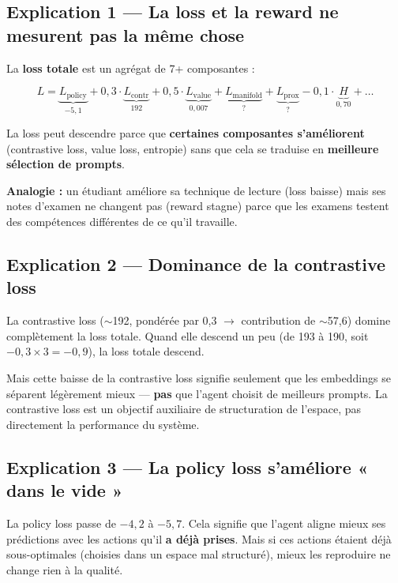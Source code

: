 \documentclass[11pt,a4paper]{article}
\begin{document}
\subsection{Explication 1 — La loss et la reward ne mesurent pas la même chose}

La \textbf{loss totale} est un agrégat de 7+ composantes :

\begin{equation}
L = \underbrace{L_{\text{policy}}}_{-5{,}1} + 0{,}3 \cdot \underbrace{L_{\text{contr}}}_{192} + 0{,}5 \cdot \underbrace{L_{\text{value}}}_{0{,}007} + \underbrace{L_{\text{manifold}}}_{?} + \underbrace{L_{\text{prox}}}_{?} - 0{,}1 \cdot \underbrace{H}_{0{,}70} + \ldots
\end{equation}

La loss peut descendre parce que \textbf{certaines composantes s'améliorent} (contrastive loss, value loss, entropie) sans que cela se traduise en \textbf{meilleure sélection de prompts}.

\textbf{Analogie :} un étudiant améliore sa technique de lecture (loss baisse) mais ses notes d'examen ne changent pas (reward stagne) parce que les examens testent des compétences différentes de ce qu'il travaille.

\subsection{Explication 2 — Dominance de la contrastive loss}

La contrastive loss ($\sim$192, pondérée par 0{,}3 $\rightarrow$ contribution de $\sim$57{,}6) domine complètement la loss totale. Quand elle descend un peu (de 193 à 190, soit $-0{,}3 \times 3 = -0{,}9$), la loss totale descend.

Mais cette baisse de la contrastive loss signifie seulement que les embeddings se séparent légèrement mieux — \textbf{pas} que l'agent choisit de meilleurs prompts. La contrastive loss est un objectif auxiliaire de structuration de l'espace, pas directement la performance du système.

\subsection{Explication 3 — La policy loss s'améliore « dans le vide »}

La policy loss passe de $-4{,}2$ à $-5{,}7$. Cela signifie que l'agent aligne mieux ses prédictions avec les actions qu'il \textbf{a déjà prises}. Mais si ces actions étaient déjà sous-optimales (choisies dans un espace mal structuré), mieux les reproduire ne change rien à la qualité.
\end{document}
